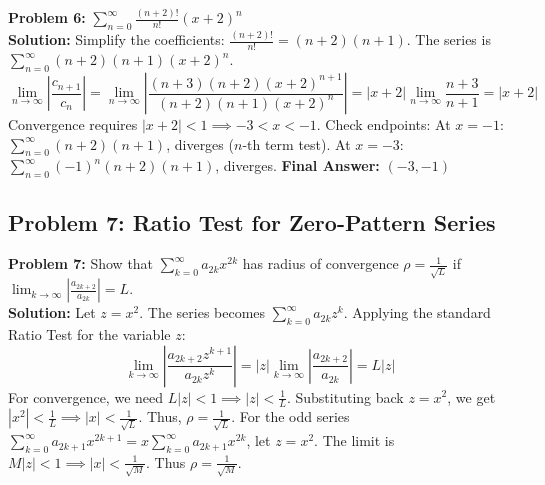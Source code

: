 \documentclass[11pt, letterpaper]{article}
\theoremstyle{definition}
\theoremstyle{remark}
\begin{document}
\textbf{Problem 6:} $\displaystyle \sum_{n=0}^{\infty} \frac{(n+2)!}{n!} (x+2)^n$
\\[6pt]
\textbf{Solution:} Simplify the coefficients: $\frac{(n+2)!}{n!} = (n+2)(n+1)$. The series is $\sum_{n=0}^{\infty} (n+2)(n+1)(x+2)^n$.
\[ \lim_{n \to \infty} \left| \frac{c_{n+1}}{c_n} \right| = \lim_{n \to \infty} \left| \frac{(n+3)(n+2)(x+2)^{n+1}}{(n+2)(n+1)(x+2)^n} \right| = |x+2| \lim_{n \to \infty} \frac{n+3}{n+1} = |x+2| \]
Convergence requires $|x+2| < 1 \implies -3 < x < -1$.
Check endpoints:
At $x = -1$: $\sum_{n=0}^{\infty} (n+2)(n+1)$, diverges ($n$-th term test).
At $x = -3$: $\sum_{n=0}^{\infty} (-1)^n(n+2)(n+1)$, diverges.
\textbf{Final Answer:} $(-3, -1)$

\subsection{Problem 7: Ratio Test for Zero-Pattern Series}
\textbf{Problem 7:} Show that $\sum_{k=0}^{\infty} a_{2k} x^{2k}$ has radius of convergence $\rho = \frac{1}{\sqrt{L}}$ if $\lim_{k \to \infty} \left| \frac{a_{2k+2}}{a_{2k}} \right| = L$.
\\[6pt]
\textbf{Solution:} Let $z = x^2$. The series becomes $\sum_{k=0}^{\infty} a_{2k} z^k$. Applying the standard Ratio Test for the variable $z$:
\[ \lim_{k \to \infty} \left| \frac{a_{2k+2} z^{k+1}}{a_{2k} z^k} \right| = |z| \lim_{k \to \infty} \left| \frac{a_{2k+2}}{a_{2k}} \right| = L |z| \]
For convergence, we need $L |z| < 1 \implies |z| < \frac{1}{L}$. Substituting back $z = x^2$, we get $|x^2| < \frac{1}{L} \implies |x| < \frac{1}{\sqrt{L}}$. Thus, $\rho = \frac{1}{\sqrt{L}}$.
For the odd series $\sum_{k=0}^{\infty} a_{2k+1} x^{2k+1} = x \sum_{k=0}^{\infty} a_{2k+1} x^{2k}$, let $z = x^2$. The limit is $M |z| < 1 \implies |x| < \frac{1}{\sqrt{M}}$. Thus $\rho = \frac{1}{\sqrt{M}}$.
\end{document}
